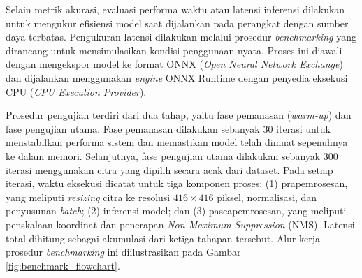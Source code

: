 Selain metrik akurasi, evaluasi performa waktu atau latensi inferensi dilakukan untuk mengukur efisiensi model saat dijalankan pada perangkat dengan sumber daya terbatas. Pengukuran latensi dilakukan melalui prosedur \textit{benchmarking} yang dirancang untuk mensimulasikan kondisi penggunaan nyata. Proses ini diawali dengan mengekspor model ke format ONNX (\textit{Open Neural Network Exchange}) dan dijalankan menggunakan \textit{engine} ONNX Runtime dengan penyedia eksekusi CPU (\textit{CPU Execution Provider}).

Prosedur pengujian terdiri dari dua tahap, yaitu fase pemanasan (\textit{warm-up}) dan fase pengujian utama. Fase pemanasan dilakukan sebanyak 30 iterasi untuk menstabilkan performa sistem dan memastikan model telah dimuat sepenuhnya ke dalam memori. Selanjutnya, fase pengujian utama dilakukan sebanyak 300 iterasi menggunakan citra yang dipilih secara acak dari dataset. Pada setiap iterasi, waktu eksekusi dicatat untuk tiga komponen proses: (1) prapemrosesan, yang meliputi \textit{resizing} citra ke resolusi $416 \times 416$ piksel, normalisasi, dan penyusunan \textit{batch}; (2) inferensi model; dan (3) pascapemrosesan, yang meliputi penskalaan koordinat dan penerapan \textit{Non-Maximum Suppression} (NMS). Latensi total dihitung sebagai akumulasi dari ketiga tahapan tersebut. Alur kerja prosedur \textit{benchmarking} ini diilustrasikan pada Gambar \ref{fig:benchmark_flowchart}.

